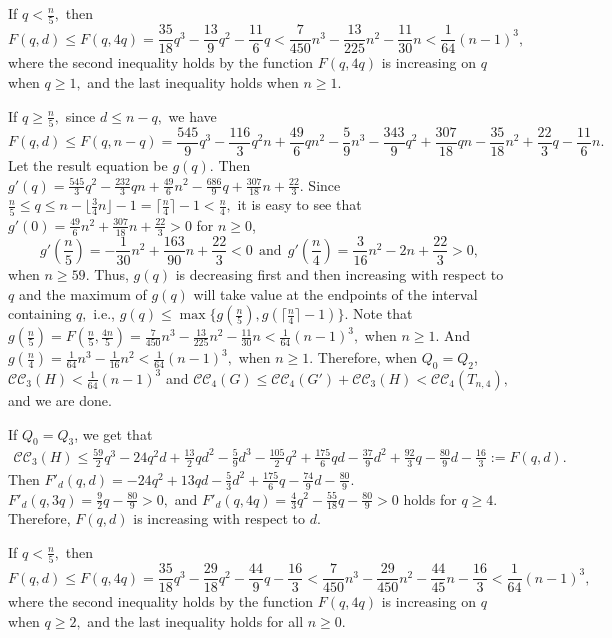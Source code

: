 \documentclass[11pt,a4paper]{article}
\newcommand{\turangraph}[2]{T_{#1,#2}}
\newcommand{\coveropt}[2]{{\mathcal{C}\mathcal{C}_{#1}(#2)}}
\begin{document}
If $q<\frac n 5,$
then $$F(q,d)\le F(q,4q)=\frac{35}{18}q^3-\frac{13}{9}q^2-\frac{11}{6}q<
\frac{7}{450}n^3-\frac{13}{225}n^2-\frac{11}{30}n<\frac{1}{64}(n-1)^3,$$
where the second inequality holds by the function $ F(q,4q)$ is increasing on $q$ when $q\ge1,$
and the last inequality holds when $n\ge 1.$

If $q\ge \frac n 5,$ since $d\le n-q,$ we have
\begin{equation*}\label{Equ:g1(q)}
F(q,d)\le F(q,n-q)=\frac{545}{9}q^3-\frac{116}{3}q^2n+\frac{49}{6}qn^2-\frac{5}{9}n^3-\frac{343}{9}q^2+\frac{307}{18}qn-\frac{35}{18}n^2+\frac{22}{3}q-\frac{11}{6}n.
\end{equation*}
Let the result equation be $g(q).$ 
Then $g'(q)=\frac{545}{3}q^2-\frac{232}{3}qn+\frac{49}{6}n^2-\frac{686}{9}q+\frac{307}{18}n+\frac{22}{3}.$
Since $\frac n 5\le q\le n-\lfloor\frac{3}{4}n\rfloor-1=\lceil\frac{n}{4}\rceil-1<\frac n 4,$
it is easy to see that 
$g'(0)=\frac{49}{6}n^2 + \frac{307}{18}n + \frac{22}{3}>0$ for $n\ge 0$,
$$g'(\frac n 5)=-\frac{1}{30}n^2+\frac{163}{90}n+\frac{22}{3}<0\ \  \text{and}\ \ 
g'(\frac n 4)=\frac{3}{16}n^2 - 2n +\frac{22}{3}>0,$$ 
when $n\ge 59.$
Thus, $g(q)$ is decreasing first and then increasing with respect to $q$ 
and the maximum of $g(q)$ will take value at the endpoints of the interval containing $q,$ i.e., 
$g(q)\le \max\{g(\frac n 5),g(\lceil\frac{n}{4}\rceil-1)\}.$
Note that 
$g(\frac n 5)=F(\frac n 5,\frac {4n} 5)=\frac{7}{450}n^3-\frac{13}{225}n^2-\frac{11}{30}n<\frac{1}{64}(n-1)^3,$ when $n\ge 1.$
And 
$g(\frac{n}{4})=\frac{1}{64}n^3-\frac{1}{16}n^2<\frac{1}{64}(n-1)^3,$
when $n\ge 1.$
Therefore,  when $Q_0=Q_2$, $\coveropt{3}{H}<\frac{1}{64}(n-1)^3$ and
$\coveropt{4}{G}\le \coveropt{4}{G'}+\coveropt{3}{H}<\coveropt{4}{\turangraph{n}{4}},$ 
and we are done.

If $Q_0=Q_3$, we get that
\begin{align*}\label{Equ:CC3(H)<F2(q,d)}
\coveropt{3}{H} \leq	
\frac{59}{2}q^3 -24q^2d +\frac{13}{2}qd^2 -\frac{5}{9}d^3
-\frac{105}{2}q^2+\frac{175}{6}qd-\frac{37}{9}d^2+\frac{92}{3}q-\frac{80}{9}d-\frac{16}{3}:=F(q,d). 
\end{align*}
Then $F'_d(q,d)=-24q^2+13qd-\frac 5 3 d^2+\frac{175}{6} q -\frac{74}{9}d -\frac{80}{9}.$
$F'_d(q,3q)=\frac 9 2 q - \frac {80} 9 >0,$ and
$F'_d(q,4q)=\frac 4 3 q^2-\frac {55}{18} q - \frac {80} 9>0$
holds for $q\geq 4.$
Therefore, $F(q,d)$ is increasing with respect to $d.$ 

If $q<\frac n 5,$
then $$F(q,d)\le F(q,4q)=\frac{35}{18}q^3-\frac{29}{18}q^2-\frac{44}{9}q-\frac {16} 3<
\frac{7}{450}n^3-\frac{29}{450}n^2-\frac{44}{45}n-\frac {16} 3<\frac{1}{64}(n-1)^3,$$
where the second inequality holds by the function $ F(q,4q)$ is increasing on $q$ when $q\ge2,$
and the last inequality holds for all $n\ge 0.$
\end{document}
